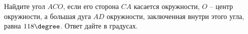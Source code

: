\begin{ex}
	\begin{condition}
		Найдите угол \( ACO \), если его сторона \( CA \) касается окружности, \( O \) – центр окружности, а большая дуга \( AD \) окружности, заключенная внутри этого угла, равна \( 118 \degree\). Ответ дайте в градусах.
	\end{condition}
\end{ex}